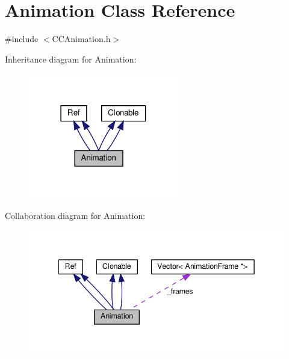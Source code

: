 \hypertarget{classAnimation}{}\section{Animation Class Reference}
\label{classAnimation}


{\ttfamily \#include $<$C\+C\+Animation.\+h$>$}



Inheritance diagram for Animation\+:
\nopagebreak
\begin{figure}[H]
\begin{center}
\leavevmode
\includegraphics[width=186pt]{classAnimation__inherit__graph}
\end{center}
\end{figure}


Collaboration diagram for Animation\+:
\nopagebreak
\begin{figure}[H]
\begin{center}
\leavevmode
\includegraphics[width=342pt]{classAnimation__coll__graph}
\end{center}
\end{figure}
